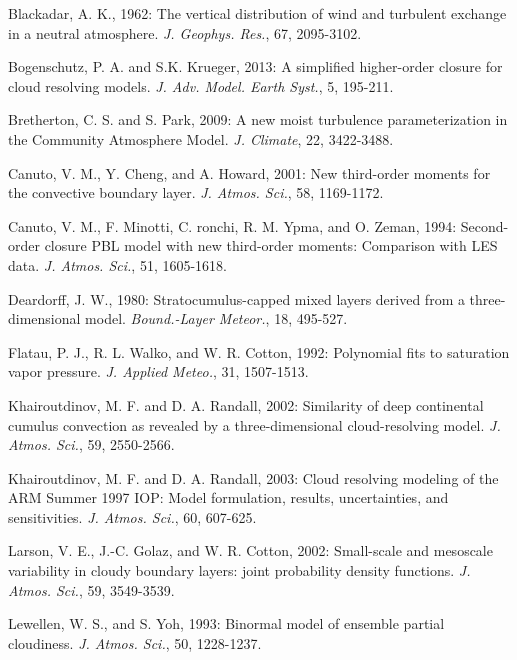 \documentclass[12pt,titlepage]{article}
\numberwithin{equation}{section}
\begin{document}
%
\pagebreak
\begin{thebibliography}{9}
Blackadar, A. K., 1962: The vertical distribution of wind and turbulent exchange in a neutral atmosphere.  \textit{J. Geophys. Res.}, 67, 2095-3102. 

Bogenschutz, P. A. and S.K. Krueger, 2013: A simplified higher-order closure for cloud resolving models. \textit{J. Adv. Model. Earth Syst.}, 5, 195-211.     

Bretherton, C. S. and S. Park, 2009: A new moist turbulence parameterization in the Community Atmosphere Model. \textit{J. Climate}, 22, 3422-3488.   

Canuto, V. M., Y. Cheng, and A. Howard, 2001: New third-order moments for the convective boundary layer. \textit{J. Atmos. Sci.}, 58, 1169-1172. 

Canuto, V. M., F. Minotti, C. ronchi, R. M. Ypma, and O. Zeman, 1994: Second-order closure PBL model with new third-order moments: Comparison with LES data. \textit{J. Atmos. Sci.}, 51, 1605-1618. 

Deardorff, J. W., 1980: Stratocumulus-capped mixed layers derived from a three-dimensional model. \textit{Bound.-Layer Meteor.}, 18, 495-527.  

Flatau, P. J., R. L. Walko, and W. R. Cotton, 1992: Polynomial fits to saturation vapor pressure. \textit{J. Applied Meteo.}, 31, 1507-1513. 

Khairoutdinov, M. F. and D. A. Randall, 2002: Similarity of deep continental cumulus convection as revealed by a three-dimensional cloud-resolving model. \textit{J. Atmos. Sci.}, 59, 2550-2566. 

Khairoutdinov, M. F. and D. A. Randall, 2003: Cloud resolving modeling of the ARM Summer 1997 IOP: Model formulation, results, uncertainties, and sensitivities. \textit{J. Atmos. Sci.}, 60, 607-625. 

Larson, V. E., J.-C. Golaz, and W. R. Cotton, 2002: Small-scale and mesoscale variability in cloudy boundary layers: joint probability density functions. \textit{J. Atmos. Sci.}, 59, 3549-3539.  

Lewellen, W. S., and S. Yoh, 1993: Binormal model of ensemble partial cloudiness. \textit{J. Atmos. Sci.}, 50, 1228-1237. 


\end{thebibliography}
\end{document}
